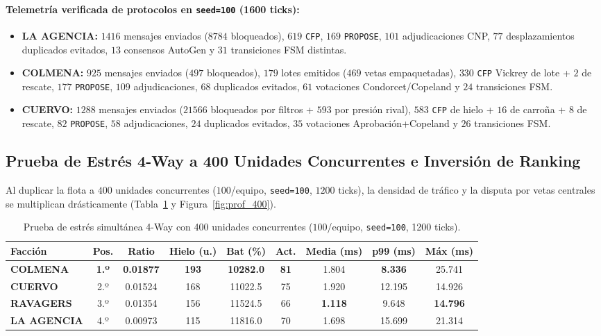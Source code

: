 \documentclass[10pt,a4paper]{article}
\begin{document}
\paragraph{Telemetría verificada de protocolos en \texttt{seed=100} (1600 ticks):}
\begin{itemize}
  \item \textbf{LA AGENCIA:} $1416$ mensajes enviados ($8784$ bloqueados), $619$ \texttt{CFP}, $169$ \texttt{PROPOSE}, $101$ adjudicaciones CNP, $77$ desplazamientos duplicados evitados, $13$ consensos AutoGen y $31$ transiciones FSM distintas.
  \item \textbf{COLMENA:} $925$ mensajes enviados ($497$ bloqueados), $179$ lotes emitidos ($469$ vetas empaquetadas), $330$ \texttt{CFP} Vickrey de lote + $2$ de rescate, $177$ \texttt{PROPOSE}, $109$ adjudicaciones, $68$ duplicados evitados, $61$ votaciones Condorcet/Copeland y $24$ transiciones FSM.
  \item \textbf{CUERVO:} $1288$ mensajes enviados ($21566$ bloqueados por filtros + $593$ por presión rival), $583$ \texttt{CFP} de hielo + $16$ de carroña + $8$ de rescate, $82$ \texttt{PROPOSE}, $58$ adjudicaciones, $24$ duplicados evitados, $35$ votaciones Aprobación+Copeland y $26$ transiciones FSM.
\end{itemize}

\subsection{Prueba de Estrés 4-Way a 400 Unidades Concurrentes e Inversión de Ranking}
Al duplicar la flota a $400$ unidades concurrentes ($100$/equipo, \texttt{seed=100}, $1200$ ticks), la densidad de tráfico y la disputa por vetas centrales se multiplican drásticamente (Tabla~\ref{tab:estres_400} y Figura~\ref{fig:prof_400}).

\begin{table}[H]
\centering
\caption{Prueba de estrés simultánea 4-Way con 400 unidades concurrentes ($100$/equipo, \texttt{seed=100}, 1200 ticks).}\label{tab:estres_400}
\small
\begin{tabular}{lcccccccc}
\toprule
\textbf{Facción} & \textbf{Pos.} & \textbf{Ratio} & \textbf{Hielo (u.)} & \textbf{Bat (\%)} & \textbf{Act.} & \textbf{Media (ms)} & \textbf{p99 (ms)} & \textbf{Máx (ms)} \\
\midrule
\textbf{COLMENA}    & \textbf{1.º} & \textbf{0.01877} & \textbf{193} & \textbf{10282.0} & \textbf{81} & 1.804 & \textbf{8.336}  & 25.741 \\
\textbf{CUERVO}     & 2.º & 0.01524 & 168 & 11022.5 & 75 & 1.920 & 12.195 & 14.926 \\
\textbf{RAVAGERS}   & 3.º & 0.01354 & 156 & 11524.5 & 66 & \textbf{1.118} & 9.648  & \textbf{14.796} \\
\textbf{LA AGENCIA} & 4.º & 0.00973 & 115 & 11816.0 & 70 & 1.698 & 15.699 & 21.314 \\
\bottomrule
\end{tabular}
\end{table}
\end{document}
